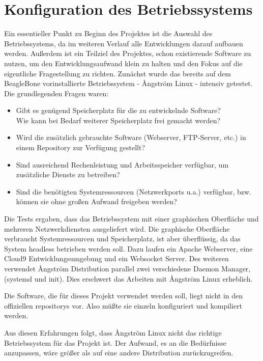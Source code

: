 \chapter{Konfiguration des Betriebssystems}

Ein essentieller Punkt zu Beginn des Projektes ist die Auswahl des Betriebssystems, da im weiteren Verlauf alle Entwicklungen darauf aufbauen werden. Außerdem ist ein Teilziel des Projektes, schon existierende Software zu nutzen, um den Entwicklungsaufwand klein zu halten und den Fokus auf die eigentliche Fragestellung zu richten. Zunächst wurde das bereits auf dem BeagleBone vorinstallierte Betriebssystem - {\AA}ngström Linux - intensiv getestet.\\

\noindent Die grundlegenden Fragen waren:

\begin{itemize}
\item Gibt es genügend Speicherplatz für die zu entwickelnde Software?\\
Wie kann bei Bedarf weiterer Speicherplatz frei gemacht werden?
\item Wird die zusätzlich gebrauchte Software (Webserver, FTP-Server, etc.) in einem Repository zur Verfügung gestellt?
\item Sind ausreichend Rechenleistung und Arbeitsspeicher verfügbar, um zusätzliche Dienste zu betreiben?
\item Sind die benötigten Systemressourcen (Netzwerkports u.a.) verfügbar, bzw. können sie ohne großen Aufwand freigeben werden?
\end{itemize}

Die Tests ergaben, dass das Betriebssystem mit einer graphischen Oberfläche und mehreren Netzwerkdiensten ausgeliefert wird. Die graphische Oberfläche verbraucht Systemressourcen und Speicherplatz, ist aber überflüssig, da das System headless betrieben werden soll. Dazu laufen ein Apache Webserver, eine Cloud9 Entwicklungsumgebung und ein Websocket Server. Des weiteren verwendet {\AA}ngström Distribution parallel zwei verschiedene Daemon Manager, (\gls{systemd} und \gls{init}). Dies erschwert das Arbeiten mit {\AA}ngström Linux erheblich.

Die Software, die für dieses Projekt verwendet werden soll, liegt nicht in den offiziellen \glspl{repository} vor. Also müßte sie einzeln konfiguriert und kompiliert werden.

Aus diesen Erfahrungen folgt, dass {\AA}ngström Linux nicht das richtige Betriebssystem für das Projekt ist. Der Aufwand, es an die Bedürfnisse anzupassen, wäre größer als auf eine andere Distribution zurückzugreifen.\\

